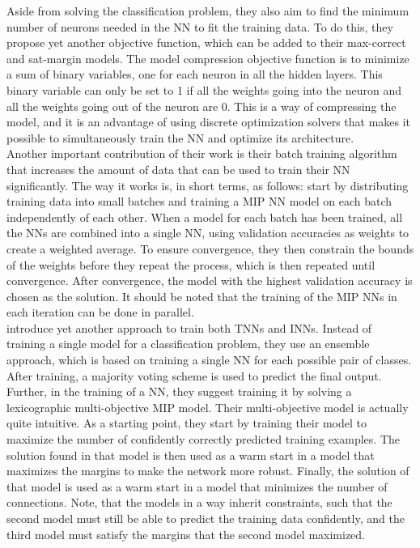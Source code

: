 \noindent Aside from solving the classification problem, they also aim to find the minimum number of neurons needed in the NN to fit the training data. To do this, they propose yet another objective function, which can be added to their max-correct and sat-margin models. The model compression objective function is to minimize a sum of binary variables, one for each neuron in all the hidden layers. This binary variable can only be set to 1 if all the weights going into the neuron and all the weights going out of the neuron are 0. This is a way of compressing the model, and it is an advantage of using discrete optimization solvers that makes it possible to simultaneously train the NN and optimize its architecture. \\

\noindent Another important contribution of their work is their batch training algorithm that increases the amount of data that can be used to train their NN significantly. The way it works is, in short terms, as follows: start by distributing training data into small batches and training a MIP NN model on each batch independently of each other. When a model for each batch has been trained, all the NNs are combined into a single NN, using validation accuracies as weights to create a weighted average. To ensure convergence, they then constrain the bounds of the weights before they repeat the process, which is then repeated until convergence. After convergence, the model with the highest validation accuracy is chosen as the solution. It should be noted that the training of the MIP NNs in each iteration can be done in parallel. \\

\noindent \cite{ambrogio2023} introduce yet another approach to train both TNNs and INNs. Instead of training a single model for a classification problem, they use an ensemble approach, which is based on training a single NN for each possible pair of classes. After training, a majority voting scheme is used to predict the final output. Further, in the training of a NN, they suggest training it by solving a lexicographic multi-objective MIP model. Their multi-objective model is actually quite intuitive. As a starting point, they start by training their model to maximize the number of confidently correctly predicted training examples. The solution found in that model is then used as a warm start in a model that maximizes the margins to make the network more robust. Finally, the solution of that model is used as a warm start in a model that minimizes the number of connections. Note, that the models in a way inherit constraints, such that the second model must still be able to predict the training data confidently, and the third model must satisfy the margins that the second model maximized. \\


